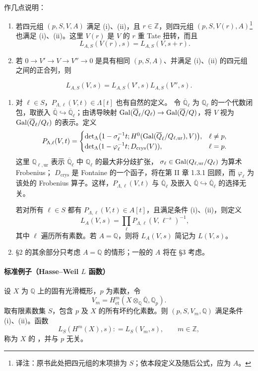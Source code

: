 作几点说明：
\begin{enumerate}[label=(\arabic*)]
\item 若四元组 $(p,S,V,A)$ 满足 (i)、(ii)，且 $r\in\mathbb Z$，则四元组
$(p,S,V(r),A)$\footnote{译注：原书此处把四元组的末项排为 $S$；依本段定义及随后公式，应为 $A$。}
也满足 (i)、(ii)。这里 $V(r)$ 是 $V$ 的 $r$ 重 Tate 扭转，而且
\[
L_{A,S}(V(r),s)=L_{A,S}(V,s+r).
\]
\item 若 $0\to V'\to V\to V''\to0$ 是具有相同 $(p,S,A)$、并满足 (i)、(ii) 的四元组之间的正合列，则
\end{enumerate}
\[
L_{A,S}(V,s)=L_{A,S}(V',s)L_{A,S}(V'',s).
\]
\begin{enumerate}[label=(\arabic*),start=3]
\item 对 $\ell\in S$，$P_{\Lambda,\ell}(V,t)\in\Lambda[t]$ 也有自然的定义。
令 $\overline{\mathbb Q}_\ell$ 为 $\mathbb Q_\ell$ 的一个代数闭包，取嵌入
$\overline{\mathbb Q}\hookrightarrow\overline{\mathbb Q}_\ell$；由诱导映射
$\operatorname{Gal}(\overline{Q}_\ell/Q_\ell)\to\operatorname{Gal}(\overline{Q}/Q)$，将 $V$ 视为
$\operatorname{Gal}(\overline{Q}_\ell/Q_\ell)$ 的表示。定义
\[
P_{\Lambda,\ell}(V,t)=
\begin{cases}
\det_\Lambda\bigl(1-\sigma_\ell^{-1}t;
H^0(\operatorname{Gal}(\overline{Q}_\ell/Q_{\ell,\mathrm{ur}}),V)\bigr),&\ell\ne p,\\
\det_\Lambda(1-\varphi_\ell^{-1}t;D_{\mathrm{crys}}(V)),&\ell=p.
\end{cases}
\]
这里 $\mathbb Q_{\ell,\mathrm{ur}}$ 表示 $\overline{\mathbb Q}_\ell$ 中 $\mathbb Q_\ell$ 的最大非分歧扩张，
$\sigma_\ell\in\operatorname{Gal}(Q_{\ell,\mathrm{ur}}/Q_\ell)$ 为算术 Frobenius；
$D_{\mathrm{crys}}$ 是 Fontaine 的一个函子，将在第 II 章 1.3.1 回顾，而 $\varphi_\ell$ 为该处的 Frobenius 算子。这样，$P_{\Lambda,\ell}(V,t)$ 与
$\overline{\mathbb Q}_\ell$ 及嵌入 $\overline{\mathbb Q}\hookrightarrow\overline{\mathbb Q}_\ell$ 的选择无关。

若对所有 $\ell\in S$ 都有 $P_{\Lambda,\ell}(V,t)\in A[t]$，且满足条件 (i)、(ii)，则定义
\[
L_A(V,s)=\prod_\ell P_{\Lambda,\ell}(V,\ell^{-s})^{-1},
\]
其中 $\ell$ 遍历所有素数。若 $A=\mathbb Q$，则将 $L_A(V,s)$ 简记为 $L(V,s)$。
\item §2 的其余部分只考虑 $A=\mathbb Q$ 的情形；一般的 $A$ 将在 §3 考虑。
\end{enumerate}

\paragraph{标准例子（Hasse--Weil $L$ 函数）}
设 $X$ 为 $\mathbb Q$ 上的固有光滑概形，$p$ 为素数，令
\[
V_m=H^m_{\mathrm{\acute et}}(X\otimes_{\mathbb Q}\overline{\mathbb Q},\mathbb Q_p).
\]
取有限素数集 $S$，包含 $p$ 及 $X$ 的所有坏约化素数。则 $(p,S,V_m,\mathbb Q)$ 满足条件 (i)、(ii)。函数
\[
L_S(H^m(X),s)\mathrel{\mathop:}=L_S(V_m,s),\qquad m\in\mathbb Z,
\]
称为 $X$ 的 ，并与 $p$ 无关。

